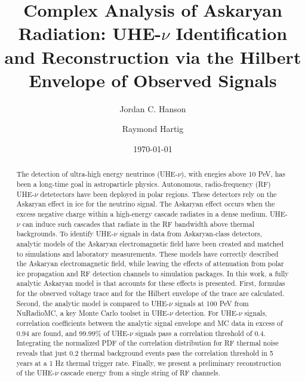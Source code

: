 \documentclass[amsmath,amssymb,aps,prd,10pt,twocolumn,showkeys]{revtex4}
\begin{document}
\title{Complex Analysis of Askaryan Radiation: UHE-$\nu$ Identification and Reconstruction via the Hilbert Envelope of Observed Signals}

\author{Jordan C. Hanson}
\author{Raymond Hartig}
\date{\today}

\begin{abstract}
The detection of ultra-high energy neutrinos (UHE-$\nu$), with enegies above 10 PeV, has been a long-time goal in astroparticle physics.  Autonomous, radio-frequency (RF) UHE-$\nu$ detetectors have been deployed in polar regions.  These detectors rely on the Askaryan effect in ice for the neutrino signal.  The Askaryan effect occurs when the excess negative charge within a high-energy cascade radiates in a dense medium.  UHE-$\nu$ can induce such cascades that radiate in the RF bandwidth above thermal backgrounds.  To identify UHE-$\nu$ signals in data from Askaryan-class detectors, analytic models of the Askaryan electromagnetic field have been created and matched to simulations and laboratory measurements.  These models have correctly described the Askaryan electromagnetic field, while leaving the effects of attenuation from polar ice propagation and RF detection channels to simulation packages.  In this work, a fully analytic Askaryan model is that accounts for these effects is presented.  First, formulas for the observed voltage trace and for the Hilbert envelope of the trace are calculated.  Second, the analytic model is compared to UHE-$\nu$ signals at 100 PeV from NuRadioMC, a key Monte Carlo toolset in UHE-$\nu$ detection.  For UHE-$\nu$ signals, correlation coefficients between the analytic signal envelope and MC data in excess of $0.94$ are found, and 99.99\% of UHE-$\nu$ signals pass a correlation threshold of 0.4.  Integrating the normalized PDF of the correlation distribution for RF thermal noise reveals that just 0.2 thermal background events pass the correlation threshold in 5 years at a 1 Hz thermal trigger rate.  Finally, we present a preliminary reconstruction of the UHE-$\nu$ cascade energy from a single string of RF channels.
\end{abstract}


\maketitle
\end{document}
